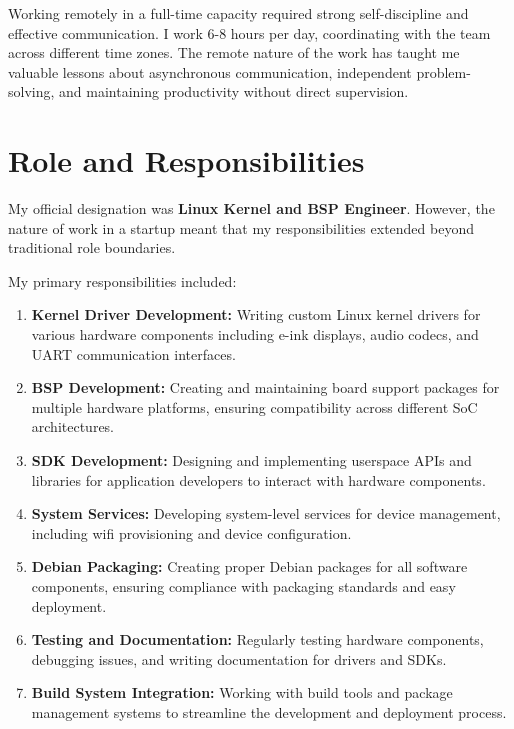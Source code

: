 \documentclass[12pt,a4paper]{report}
\begin{document}
\vspace{0.3cm}

Working remotely in a full-time capacity required strong self-discipline and effective communication. I work 6-8 hours per day, coordinating with the team across different time zones. The remote nature of the work has taught me valuable lessons about asynchronous communication, independent problem-solving, and maintaining productivity without direct supervision.

\section{Role and Responsibilities}

My official designation was \textbf{Linux Kernel and BSP Engineer}. However, the nature of work in a startup meant that my responsibilities extended beyond traditional role boundaries.

\vspace{0.3cm}

My primary responsibilities included:

\begin{enumerate}[itemsep=0.3cm]
    \item \textbf{Kernel Driver Development:} Writing custom Linux kernel drivers for various hardware components including e-ink displays, audio codecs, and UART communication interfaces.

    \item \textbf{BSP Development:} Creating and maintaining board support packages for multiple hardware platforms, ensuring compatibility across different SoC architectures.

    \item \textbf{SDK Development:} Designing and implementing userspace APIs and libraries for application developers to interact with hardware components.

    \item \textbf{System Services:} Developing system-level services for device management, including wifi provisioning and device configuration.

    \item \textbf{Debian Packaging:} Creating proper Debian packages for all software components, ensuring compliance with packaging standards and easy deployment.

    \item \textbf{Testing and Documentation:} Regularly testing hardware components, debugging issues, and writing documentation for drivers and SDKs.

    \item \textbf{Build System Integration:} Working with build tools and package management systems to streamline the development and deployment process.
\end{enumerate}
\end{document}

